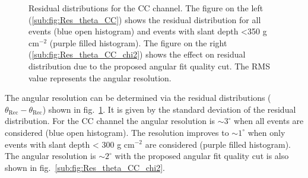 \begin{figure}[h!]
  \centering
  \hfill
  \caption{Residual distributions for the CC channel. The figure on the left (\ref{sub:fig:Res_theta_CC}) shows the residual distribution for all events (blue open histogram) and events with slant depth <350 g cm$^{-2}$ (purple filled histogram). The figure on the right (\ref{sub:fig:Res_theta_CC_chi2}) shows the effect on residual distribution due to the proposed angular fit quality cut. The RMS value represents the angular resolution.}
  \label{fig:Res_Theta}
\end{figure}

The angular resolution can be determined via the residual distributions ($\theta_{\text{Rec}} - \theta_{\text{Rec}}$) shown in fig.~\ref{fig:Res_Theta}. It is given by the standard deviation of the residual distribution. For the CC channel the angular resolution is $\sim 3^{\circ}$ when all events are considered (blue open histogram). The resolution improves to $\sim 1^{\circ}$ when only events with slant depth < 300 g cm$^{-2}$ are considered (purple filled histogram). The angular resolution is $\sim 2^{\circ}$ with the proposed angular fit quality cut is also shown in fig.~\ref{sub:fig:Res_theta_CC_chi2}. 

